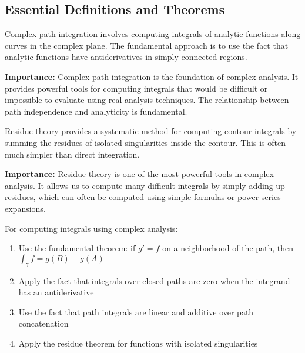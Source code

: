 \subsection*{Essential Definitions and Theorems}

\begin{definition}
Complex path integration involves computing integrals of analytic functions along curves in the complex plane. The fundamental approach is to use the fact that analytic functions have antiderivatives in simply connected regions.
\end{definition}

\noindent\textbf{Importance:} Complex path integration is the foundation of complex analysis. It provides powerful tools for computing integrals that would be difficult or impossible to evaluate using real analysis techniques. The relationship between path independence and analyticity is fundamental.



\begin{definition}
Residue theory provides a systematic method for computing contour integrals by summing the residues of isolated singularities inside the contour. This is often much simpler than direct integration.
\end{definition}

\noindent\textbf{Importance:} Residue theory is one of the most powerful tools in complex analysis. It allows us to compute many difficult integrals by simply adding up residues, which can often be computed using simple formulas or power series expansions.



\begin{theorem}
For computing integrals using complex analysis:
\begin{enumerate}[label=(\alph*)]
\item Use the fundamental theorem: if $g' = f$ on a neighborhood of the path, then $\int_\gamma f = g(B) - g(A)$
\item Apply the fact that integrals over closed paths are zero when the integrand has an antiderivative
\item Use the fact that path integrals are linear and additive over path concatenation
\item Apply the residue theorem for functions with isolated singularities
\end{enumerate}
\end{theorem}

